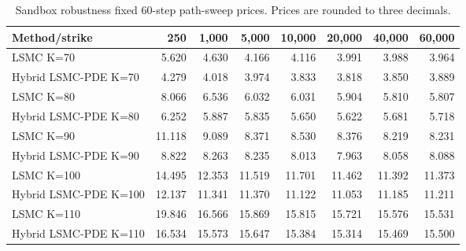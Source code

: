 \begin{table}[H]\centering
\caption{Sandbox robustness fixed 60-step path-sweep prices. Prices are rounded to three decimals.}
\begin{tabular}{lrrrrrrr}
\toprule
Method/strike & 250 & 1,000 & 5,000 & 10,000 & 20,000 & 40,000 & 60,000 \\
\midrule
LSMC K=70 & 5.620 & 4.630 & 4.166 & 4.116 & 3.991 & 3.988 & 3.964 \\
Hybrid LSMC-PDE K=70 & 4.279 & 4.018 & 3.974 & 3.833 & 3.818 & 3.850 & 3.889 \\
LSMC K=80 & 8.066 & 6.536 & 6.032 & 6.031 & 5.904 & 5.810 & 5.807 \\
Hybrid LSMC-PDE K=80 & 6.252 & 5.887 & 5.835 & 5.650 & 5.622 & 5.681 & 5.718 \\
LSMC K=90 & 11.118 & 9.089 & 8.371 & 8.530 & 8.376 & 8.219 & 8.231 \\
Hybrid LSMC-PDE K=90 & 8.822 & 8.263 & 8.235 & 8.013 & 7.963 & 8.058 & 8.088 \\
LSMC K=100 & 14.495 & 12.353 & 11.519 & 11.701 & 11.462 & 11.392 & 11.373 \\
Hybrid LSMC-PDE K=100 & 12.137 & 11.341 & 11.370 & 11.122 & 11.053 & 11.185 & 11.211 \\
LSMC K=110 & 19.846 & 16.566 & 15.869 & 15.815 & 15.721 & 15.576 & 15.531 \\
Hybrid LSMC-PDE K=110 & 16.534 & 15.573 & 15.647 & 15.384 & 15.314 & 15.469 & 15.500 \\
\bottomrule
\end{tabular}
\end{table}
